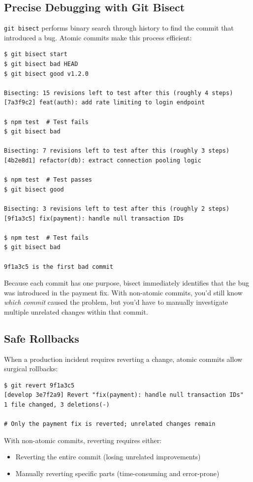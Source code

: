\subsection{Precise Debugging with Git Bisect}
\texttt{git bisect} performs binary search through history to find the commit that introduced a bug. Atomic commits make this process efficient:

\begin{lstlisting}[style=shell,caption={Using git bisect with atomic commits}]
$ git bisect start
$ git bisect bad HEAD
$ git bisect good v1.2.0

Bisecting: 15 revisions left to test after this (roughly 4 steps)
[7a3f9c2] feat(auth): add rate limiting to login endpoint

$ npm test  # Test fails
$ git bisect bad

Bisecting: 7 revisions left to test after this (roughly 3 steps)
[4b2e8d1] refactor(db): extract connection pooling logic

$ npm test  # Test passes
$ git bisect good

Bisecting: 3 revisions left to test after this (roughly 2 steps)
[9f1a3c5] fix(payment): handle null transaction IDs

$ npm test  # Test fails
$ git bisect bad

9f1a3c5 is the first bad commit
\end{lstlisting}

Because each commit has one purpose, bisect immediately identifies that the bug was introduced in the payment fix. With non-atomic commits, you'd still know \textit{which commit} caused the problem, but you'd have to manually investigate multiple unrelated changes within that commit.

\subsection{Safe Rollbacks}
When a production incident requires reverting a change, atomic commits allow surgical rollbacks:

\begin{lstlisting}[style=shell,caption={Reverting an atomic commit cleanly}]
$ git revert 9f1a3c5
[develop 3e7f2a9] Revert "fix(payment): handle null transaction IDs"
1 file changed, 3 deletions(-)

# Only the payment fix is reverted; unrelated changes remain
\end{lstlisting}

With non-atomic commits, reverting requires either:
\begin{itemize}
  \item Reverting the entire commit (losing unrelated improvements)
  \item Manually reverting specific parts (time-consuming and error-prone)
\end{itemize}

